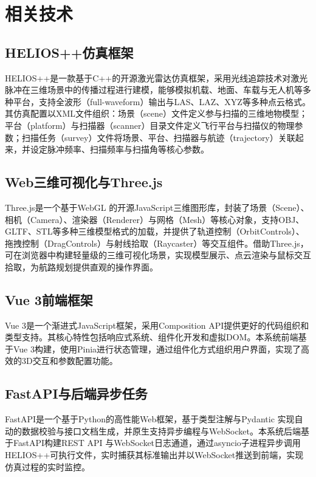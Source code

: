 \documentclass[a4paper,fleqn]{cas-sc}
\begin{document}
\section{相关技术}\label{sec:tech}

\subsection{HELIOS++仿真框架}
HELIOS++是一款基于C++的开源激光雷达仿真框架，采用光线追踪技术对激光脉冲在三维场景中的传播过程进行建模，能够模拟机载、地面、车载与无人机等多种平台，支持全波形（full-waveform）输出与LAS、LAZ、XYZ等多种点云格式。其仿真配置以XML文件组织：场景（scene）文件定义参与扫描的三维地物模型；平台（platform）与扫描器（scanner）目录文件定义飞行平台与扫描仪的物理参数；扫描任务（survey）文件将场景、平台、扫描器与航迹（trajectory）关联起来，并设定脉冲频率、扫描频率与扫描角等核心参数。

\subsection{Web三维可视化与Three.js}
Three.js是一个基于WebGL \citep{webgl} 的开源JavaScript三维图形库，封装了场景（Scene）、相机（Camera）、渲染器（Renderer）与网格（Mesh）等核心对象，支持OBJ、GLTF、STL等多种三维模型格式的加载，并提供了轨道控制（OrbitControls）、拖拽控制（DragControls）与射线拾取（Raycaster）等交互组件。借助Three.js，可在浏览器中构建轻量级的三维可视化场景，实现模型展示、点云渲染与鼠标交互拾取，为航路规划提供直观的操作界面。

\subsection{Vue 3前端框架}
Vue 3是一个渐进式JavaScript框架，采用Composition API提供更好的代码组织和类型支持。其核心特性包括响应式系统、组件化开发和虚拟DOM。本系统前端基于Vue 3构建，使用Pinia进行状态管理，通过组件化方式组织用户界面，实现了高效的3D交互和参数配置功能。

\subsection{FastAPI与后端异步任务}
FastAPI是一个基于Python的高性能Web框架，基于类型注解与Pydantic \citep{pydantic} 实现自动的数据校验与接口文档生成，并原生支持异步编程与WebSocket。本系统后端基于FastAPI构建REST API \citep{fielding2000rest} 与WebSocket日志通道，通过asyncio子进程异步调用HELIOS++可执行文件，实时捕获其标准输出并以WebSocket推送到前端，实现仿真过程的实时监控。
\end{document}
